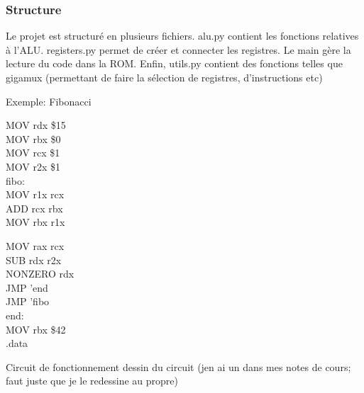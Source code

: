 \documentclass[12pt]{beamer}
\begin{document}
\begin{frame}
\frametitle{Structure}
   
   Le projet est structuré en plusieurs fichiers. alu.py contient les fonctions relatives à 
   l'ALU. registers.py permet de créer et connecter les registres. Le main gère la lecture du code
   dans la ROM. Enfin, utils.py contient des fonctions telles que gigamux (permettant de faire la sélection
   de registres, d'instructions etc)
\end{frame}

\begin{frame}{Exemple: Fibonacci}

    \begin{minipage}[t]{0.48\linewidth}
        MOV  rdx \$15 \\
        MOV  rbx \$0 \\
        MOV  rcx \$1 \\

        MOV  r2x \$1 \\
        fibo: \\
        MOV   r1x rcx \\
        ADD   rcx rbx \\
        MOV   rbx r1x \\
    \end{minipage}\hfill
    \begin{minipage}[t]{0.48\linewidth}
        MOV   rax rcx \\
        SUB   rdx r2x \\
        NONZERO rdx \\
        JMP   'end \\
        JMP   'fibo \\
        
        end: \\
            MOV rbx \$42 \\
        
        .data \\
        \end{minipage}

\end{frame}


\begin{frame}{Circuit de fonctionnement}
    dessin du circuit (jen ai un dans mes notes de cours; faut juste que je le redessine au propre)
\end{frame}
\end{document}
